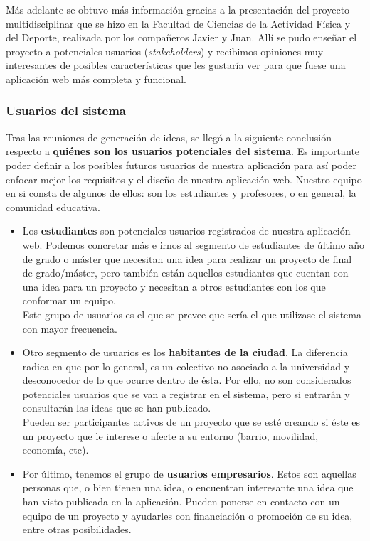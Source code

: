 Más adelante se obtuvo más información gracias a la presentación del proyecto multidisciplinar que se hizo en la Facultad de Ciencias de la Actividad Física y del Deporte, realizada por los compañeros Javier y Juan. Allí se pudo enseñar el proyecto a potenciales usuarios (\textit{stakeholders}) y recibimos opiniones muy interesantes de posibles características que les gustaría ver para que fuese una aplicación web más completa y funcional.

\subsubsection{Usuarios del sistema}
Tras las reuniones de generación de ideas, se llegó a la siguiente conclusión respecto a \textbf{quiénes son los usuarios potenciales del sistema}. Es importante poder definir a los posibles futuros usuarios de nuestra aplicación para así poder enfocar mejor los requisitos y el diseño de nuestra aplicación web. Nuestro equipo en si consta de algunos de ellos: son los estudiantes y profesores, o en general, la comunidad educativa.

\begin{itemize}
    \item Los \textbf{estudiantes} son potenciales usuarios registrados de nuestra aplicación web. Podemos concretar más e irnos al segmento de estudiantes de último año de grado o máster que necesitan una idea para realizar un proyecto de final de grado/máster, pero también están aquellos estudiantes que cuentan con una idea para un proyecto y necesitan a otros estudiantes con los que conformar un equipo.\\
    Este grupo de usuarios es el que se prevee que sería el que utilizase el sistema con mayor frecuencia.
    \item Otro segmento de usuarios es los \textbf{habitantes de la ciudad}. La diferencia radica en que por lo general, es un colectivo no asociado a la universidad y desconocedor de lo que ocurre dentro de ésta. Por ello, no son considerados potenciales usuarios que se van a registrar en el sistema, pero si entrarán y consultarán las ideas que se han publicado.\\
    Pueden ser participantes activos de un proyecto que se esté creando si éste es un proyecto que le interese o afecte a su entorno (barrio, movilidad, economía, etc).
    \item Por último, tenemos el grupo de \textbf{usuarios empresarios}. Estos son aquellas personas que, o bien tienen una idea, o encuentran interesante una idea que han visto publicada en la aplicación. Pueden ponerse en contacto con un equipo de un proyecto y ayudarles con financiación o promoción de su idea, entre otras posibilidades.
\end{itemize}

